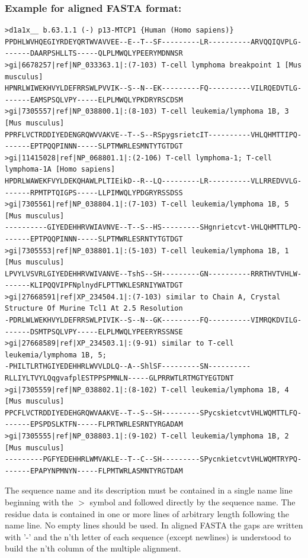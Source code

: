 \documentclass[11pt,a4paper]{article}
\begin{document}
\subsubsection*{Example for aligned FASTA format:}

\scriptsize\begin{verbatim}
>d1a1x__ b.63.1.1 (-) p13-MTCP1 {Human (Homo sapiens)}
PPDHLWVHQEGIYRDEYQRTWVAVVEE--E--T--SF---------LR----------ARVQQIQVPLG-------DAARPSHLLTS-----QLPLMWQLYPEERYMDNNSR
>gi|6678257|ref|NP_033363.1|:(7-103) T-cell lymphoma breakpoint 1 [Mus musculus]
HPNRLWIWEKHVYLDEFRRSWLPVVIK--S--N--EK---------FQ----------VILRQEDVTLG-------EAMSPSQLVPY-----ELPLMWQLYPKDRYRSCDSM
>gi|7305557|ref|NP_038800.1|:(8-103) T-cell leukemia/lymphoma 1B, 3 [Mus musculus]
PPRFLVCTRDDIYEDENGRQWVVAKVE--T--S--RSpygsrietcIT----------VHLQHMTTIPQ-------EPTPQQPINNN-----SLPTMWRLESMNTYTGTDGT
>gi|11415028|ref|NP_068801.1|:(2-106) T-cell lymphoma-1; T-cell lymphoma-1A [Homo sapiens]
HPDRLWAWEKFVYLDEKQHAWLPLTIEikD--R--LQ---------LR----------VLLRREDVVLG-------RPMTPTQIGPS-----LLPIMWQLYPDGRYRSSDSS
>gi|7305561|ref|NP_038804.1|:(7-103) T-cell leukemia/lymphoma 1B, 5 [Mus musculus]
----------GIYEDEHHRVWIAVNVE--T--S--HS---------SHgnrietcvt-VHLQHMTTLPQ-------EPTPQQPINNN-----SLPTMWRLESRNTYTGTDGT
>gi|7305553|ref|NP_038801.1|:(5-103) T-cell leukemia/lymphoma 1B, 1 [Mus musculus]
LPVYLVSVRLGIYEDEHHRVWIVANVE--TshS--SH---------GN----------RRRTHVTVHLW-------KLIPQQVIPFNplnydFLPTTWKLESRNIYWATDGT
>gi|27668591|ref|XP_234504.1|:(7-103) similar to Chain A, Crystal Structure Of Murine Tcl1 At 2.5 Resolution
-PDRLWLWEKHVYLDEFRRSWLPIVIK--S--N--GK---------FQ----------VIMRQKDVILG-------DSMTPSQLVPY-----ELPLMWQLYPEERYRSSNSE
>gi|27668589|ref|XP_234503.1|:(9-91) similar to T-cell leukemia/lymphoma 1B, 5;
-PHILTLRTHGIYEDEHHRLWVVLDLQ--A--ShlSF---------SN----------RLLIYLTVYLQqgvafplESTPPSPMNLN-----GLPRRWTLRTMGTYEGTDNT
>gi|7305559|ref|NP_038802.1|:(8-102) T-cell leukemia/lymphoma 1B, 4 [Mus musculus] 
PPCFLVCTRDDIYEDEHGRQWVAAKVE--T--S--SH---------SPycskietcvtVHLWQMTTLFQ-------EPSPDSLKTFN-----FLPRTWRLESRNTYRGADAM
>gi|7305555|ref|NP_038803.1|:(9-102) T-cell leukemia/lymphoma 1B, 2 [Mus musculus]
---------PGFYEDEHHRLWMVAKLE--T--C--SH---------SPycnkietcvtVHLWQMTRYPQ-------EPAPYNPMNYN-----FLPMTWRLASMNTYRGTDAM
\end{verbatim}\normalsize

The sequence name and its description must be contained in a single name line beginning 
with the $>$ symbol and followed directly by the sequence name. The residue data is 
contained in one or more lines of arbitrary length following the name line. No empty 
lines should be used. In aligned FASTA the gaps are written with '-' and the n'th 
letter of each sequence (except newlines) is understood to build the n'th column of the 
multiple alignment. 
\end{document}
